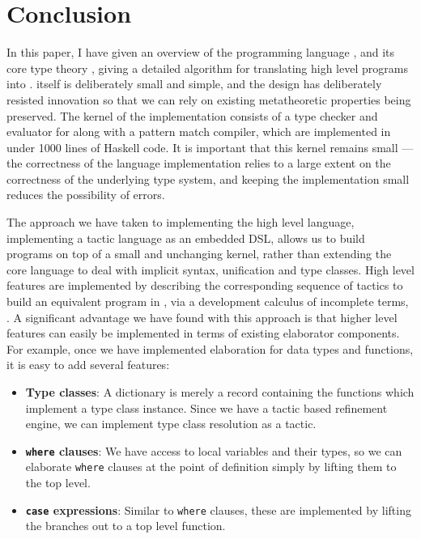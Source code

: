 

\section{Conclusion}

\label{sect:conclusion}

In this paper, I have given an overview of the programming language \Idris{},
and its core type theory \TT{}, giving a detailed algorithm for translating
high level programs into \TT{}.
\TT{} itself is deliberately small and simple, and the design has deliberately
resisted innovation so that we can rely on existing metatheoretic properties
being preserved. The kernel of the \Idris{} implementation consists of a type checker
and evaluator for \TT{} along with a pattern match compiler, which are implemented
in under 1000 lines of Haskell code. It is important that this kernel remains small
--- the correctness of the language implementation relies to a large extent on
the correctness of the underlying type system, and keeping the implementation small
reduces the possibility of errors.

The approach we have taken to implementing the high level language, implementing
a tactic language as an embedded DSL, allows us to
build programs on top of a small and unchanging kernel, rather than extending 
the core language to deal with implicit syntax, unification and type classes.
High level \Idris{} features are implemented by describing the corresponding
sequence of tactics to build an equivalent program in \TT{}, via a development
calculus of incomplete terms, \TTdev{}. A significant advantage we have found with
this approach is that higher level features can easily be implemented in terms
of existing elaborator components. For example, once we have implemented elaboration
for data types and functions, it is easy to add several features:

\begin{itemize}
\item \textbf{Type classes}: A dictionary is merely a record containing the
functions which implement a type class instance. Since we have a tactic based
refinement engine, we can implement type class resolution as a tactic.
\item \textbf{\texttt{where} clauses}: We have access to local variables and
their types, so we can
elaborate \texttt{where} clauses at the point of definition simply by lifting
them to the top level. 
\item \textbf{\texttt{case} expressions}: Similar to \texttt{where} clauses,
these are implemented by lifting the branches out to a top level function.
\end{itemize}

